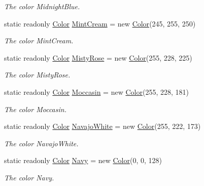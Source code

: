 \begin{DoxyCompactItemize}
\begin{DoxyCompactList}\small\item\em The color Midnight\-Blue. \end{DoxyCompactList}\item 
static readonly \hyperlink{struct_tri_devs_1_1_tri_engine2_d_1_1_color}{Color} \hyperlink{struct_tri_devs_1_1_tri_engine2_d_1_1_color_a061995739564ce7231a53de85ab530e5}{Mint\-Cream} = new \hyperlink{struct_tri_devs_1_1_tri_engine2_d_1_1_color}{Color}(245, 255, 250)
\begin{DoxyCompactList}\small\item\em The color Mint\-Cream. \end{DoxyCompactList}\item 
static readonly \hyperlink{struct_tri_devs_1_1_tri_engine2_d_1_1_color}{Color} \hyperlink{struct_tri_devs_1_1_tri_engine2_d_1_1_color_adfdfdf851699fe286e5e6b1ec33400e6}{Misty\-Rose} = new \hyperlink{struct_tri_devs_1_1_tri_engine2_d_1_1_color}{Color}(255, 228, 225)
\begin{DoxyCompactList}\small\item\em The color Misty\-Rose. \end{DoxyCompactList}\item 
static readonly \hyperlink{struct_tri_devs_1_1_tri_engine2_d_1_1_color}{Color} \hyperlink{struct_tri_devs_1_1_tri_engine2_d_1_1_color_adad98fb9f15f90dfe940f830cbcb62ca}{Moccasin} = new \hyperlink{struct_tri_devs_1_1_tri_engine2_d_1_1_color}{Color}(255, 228, 181)
\begin{DoxyCompactList}\small\item\em The color Moccasin. \end{DoxyCompactList}\item 
static readonly \hyperlink{struct_tri_devs_1_1_tri_engine2_d_1_1_color}{Color} \hyperlink{struct_tri_devs_1_1_tri_engine2_d_1_1_color_a1f9c386ef71feaf0aa8b9f87e3340b1f}{Navajo\-White} = new \hyperlink{struct_tri_devs_1_1_tri_engine2_d_1_1_color}{Color}(255, 222, 173)
\begin{DoxyCompactList}\small\item\em The color Navajo\-White. \end{DoxyCompactList}\item 
static readonly \hyperlink{struct_tri_devs_1_1_tri_engine2_d_1_1_color}{Color} \hyperlink{struct_tri_devs_1_1_tri_engine2_d_1_1_color_ad24e57370aeb40d47dc504b5a25eb9e7}{Navy} = new \hyperlink{struct_tri_devs_1_1_tri_engine2_d_1_1_color}{Color}(0, 0, 128)
\begin{DoxyCompactList}\small\item\em The color Navy. \end{DoxyCompactList}\item 

\end{DoxyCompactItemize}
